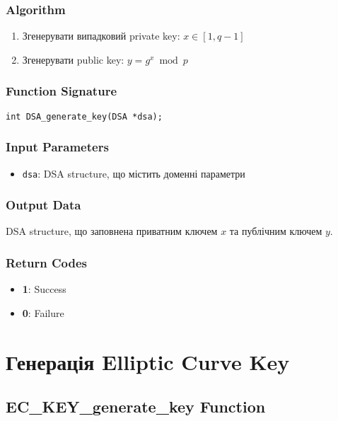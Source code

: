 \subsubsection{Algorithm}
\begin{enumerate}
    \item Згенерувати випадковий private key: $x \in [1, q-1]$
    \item Згенерувати public key: $y = g^x \bmod p$
\end{enumerate}

\subsubsection{Function Signature}
\begin{verbatim}
int DSA_generate_key(DSA *dsa);
\end{verbatim}

\subsubsection{Input Parameters}
\begin{itemize}
    \item \texttt{dsa}: DSA structure, що містить доменні параметри
\end{itemize}

\subsubsection{Output Data}
DSA structure, що заповнена приватним ключем $x$ та публічним ключем $y$.

\subsubsection{Return Codes}
\begin{itemize}
    \item \textbf{1}: Success
    \item \textbf{0}: Failure
\end{itemize}

\section{Генерація Elliptic Curve Key}

\subsection{EC\_KEY\_generate\_key Function}

